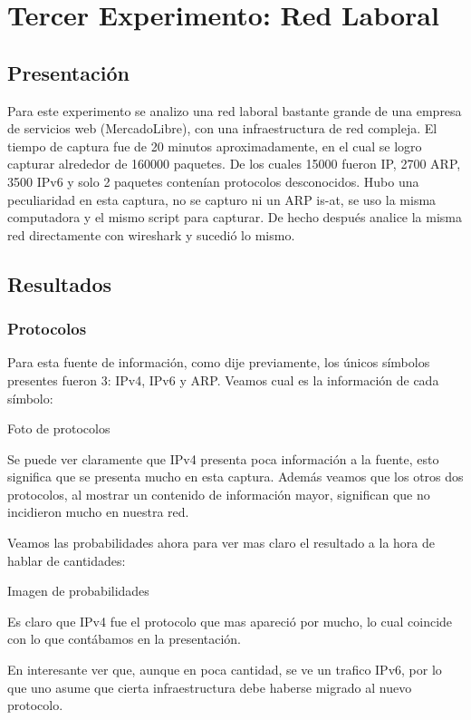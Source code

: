 \documentclass{article}
\theoremstyle{definition}
\theoremstyle{remark}
\begin{document}
\newpage

\section{Tercer Experimento: Red Laboral}

\subsection{Presentación}
Para este experimento se analizo una red laboral bastante grande de una empresa de servicios web (MercadoLibre), con una infraestructura de red compleja. 
El tiempo de captura fue de 20 minutos aproximadamente, en el cual se logro capturar alrededor de 160000 paquetes. De los cuales 15000 fueron IP, 2700 ARP, 3500 IPv6 y solo 2 paquetes contenían protocolos desconocidos.
Hubo una peculiaridad en esta captura, no se capturo ni un ARP is-at, se uso la misma computadora y el mismo script para capturar. De hecho después analice la misma red directamente con wireshark y sucedió lo mismo.

\subsection{Resultados}
\subsubsection{Protocolos}
Para esta fuente de información, como dije previamente, los únicos símbolos presentes fueron 3: IPv4, IPv6 y ARP. Veamos cual es la información de cada símbolo:

Foto de protocolos

Se puede ver claramente que IPv4 presenta poca información a la fuente, esto significa que se presenta mucho en esta captura. Además veamos que los otros dos protocolos, al mostrar un contenido de información mayor, significan que no incidieron mucho en nuestra red.

Veamos las probabilidades ahora para ver mas claro el resultado a la hora de hablar de cantidades:

Imagen de probabilidades

Es claro que IPv4 fue el protocolo que mas apareció por mucho, lo cual coincide con lo que contábamos en la presentación. 

En interesante ver que, aunque en poca cantidad, se ve un trafico IPv6, por lo que uno asume que cierta infraestructura debe haberse migrado al nuevo protocolo.
\end{document}
